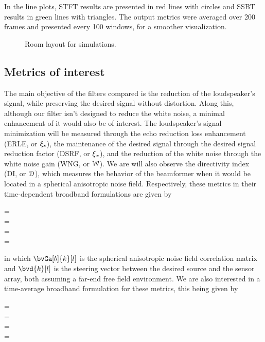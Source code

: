In the line plots, STFT results are presented in red lines with circles and SSBT results in green lines with triangles. The output metrics were averaged over 200 frames and presented every 100 windows, for a smoother visualization.

\begin{figure}[!ht]
	\centering
	
	\caption{Room layout for simulations.}
	\label{fig:room_layout}
\end{figure}
%

\subsection{Metrics of interest}

The main objective of the filters compared is the reduction of the loudspeaker's signal, while preserving the desired signal without distortion. Along this, although our filter isn't designed to reduce the white noise, a minimal enhancement of it would also be of interest. The loudspeaker's signal minimization will be measured through the echo reduction loss enhancement (ERLE, or $\xi_{s}$), the maintenance of the desired signal through the desired signal reduction factor (DSRF, or $\xi_{x}$), and the reduction of the white noise through the white noise gain (WNG, or $\mathcal{W}$). We are will also observe the directivity index (DI, or $\mathcal{D}$), which measures the behavior of the beamformer when it would be located in a spherical anisotropic noise field. Respectively, these metrics in their time-dependent broadband formulations are given by
\begin{subgather}
	\dsrf[l] =  \\
	\erle[l] =  \\
	\wng[l] =  \\
	\di[l] = 
\end{subgather}
in which $\bvGa[b]{k}[l]$ is the spherical anisotropic noise field correlation matrix \cite{habets_generating_2007} and $\bvd{k}[l]$ is the steering vector between the desired source and the sensor array, both assuming a far-end free field environment. We are also interested in a time-average broadband formulation for these metrics, this being given by
\begin{subgather}
	\dsrf =  \\
	\erle =  \\
	\wng =  \\
	\di = 
\end{subgather}

